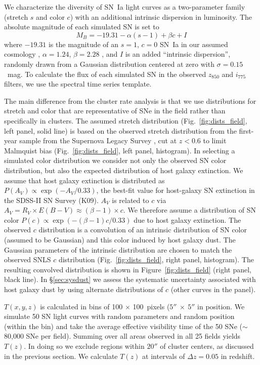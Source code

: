 We characterize the diversity of SN~Ia light curves as
a two-parameter family (stretch $s$ and color $c$) with an additional
intrinsic dispersion in luminosity. The absolute magnitude of each
simulated SN is set to
\begin{equation}
M_B = -19.31 - \alpha (s-1) + \beta c + I
\end{equation}
where $-19.31$ is the magnitude of an $s=1$, $c=0$ SN~Ia in our
assumed cosmology \citep{astier06a}, $\alpha = 1.24$, $\beta = 2.28$
\citep{kowalski08a}, and $I$ is an added ``intrinsic dispersion'',
randomly drawn from a Gaussian distribution centered at zero with
$\sigma = 0.15$~mag. To calculate the flux of each simulated SN in the
observed $z_{850}$ and $i_{775}$ filters, we use the \citet{hsiao07a}
spectral time series template.

The main difference from the cluster rate analysis is that we use
distributions for stretch and color that are representative of SNe in
the field rather than specifically in clusters. The assumed stretch
distribution (Fig.~\ref{fig:dists_field}, left panel, solid line) is based
on the observed stretch distribution from the first-year sample from
the Supernova Legacy Survey \citep[SNLS;][]{astier06a}, cut at $z<0.6$
to limit Malmquist bias (Fig.~\ref{fig:dists_field}, left panel,
histogram). In selecting a simulated color distribution we consider
not only the observed SN color distribution, but also the expected
distribution of host galaxy extinction. We assume that host galaxy
extinction is distributed as $P(A_V) \propto \exp(-A_V/0.33)$, the
best-fit value for host-galaxy SN extinction in the SDSS-II SN Survey
(K09).  $A_V$ is related to $c$ via
$A_V = R_V \times E(B-V) \approx (\beta-1) \times c$. We therefore
assume a distribution of SN color $P(c) \propto
\exp(-(\beta-1)c/0.33)$ due to host galaxy extinction. The observed
$c$ distribution is a convolution of an intrinsic distribution of SN
color (assumed to be Gaussian) and this color induced by host galaxy
dust. The Gaussian parameters of the intrinsic distribution are chosen
to match the observed SNLS $c$ distribution (Fig.~\ref{fig:dists_field},
right panel, histogram). The resulting convolved distribution is shown
in Figure~\ref{fig:dists_field} (right panel, black line). In
\S\ref{sec:sysdust} we assess the systematic uncertainty associated
with host galaxy dust by using alternate distributions of  $c$
(other curves in the panel). 

$T(x,y,z)$ is calculated in bins of 100 $\times$ 100~pixels
($5''\ \times\ 5''$ in position. We simulate 50 SN light curves with
random parameters and random position (within the bin) and take the
average effective visibility time of the 50 SNe ($\sim$80,000 SNe per
field). Summing over all areas observed in all 25 fields yields
$T(z)$. In doing so we exclude regions within $20''$ of cluster
centers, as discussed in the previous section. We calculate $T(z)$ at
intervals of $\Delta z = 0.05$ in redshift.
